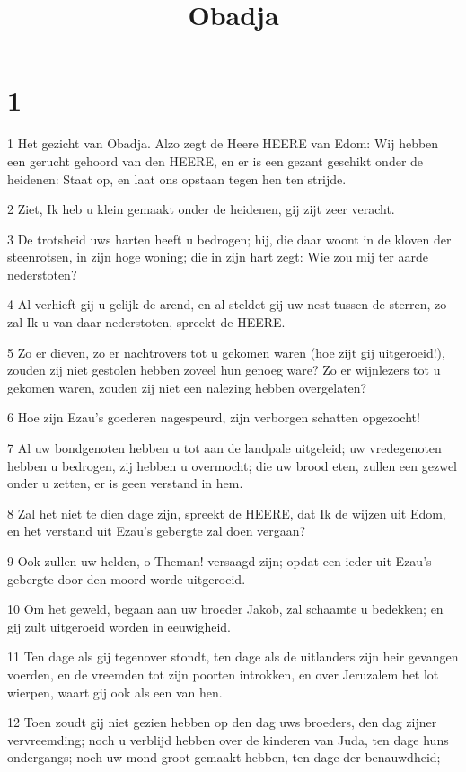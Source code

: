 

\title{Obadja}



\chapter{1}

\par 1 Het gezicht van Obadja. Alzo zegt de Heere HEERE van Edom: Wij hebben een gerucht gehoord van den HEERE, en er is een gezant geschikt onder de heidenen: Staat op, en laat ons opstaan tegen hen ten strijde.
\par 2 Ziet, Ik heb u klein gemaakt onder de heidenen, gij zijt zeer veracht.
\par 3 De trotsheid uws harten heeft u bedrogen; hij, die daar woont in de kloven der steenrotsen, in zijn hoge woning; die in zijn hart zegt: Wie zou mij ter aarde nederstoten?
\par 4 Al verhieft gij u gelijk de arend, en al steldet gij uw nest tussen de sterren, zo zal Ik u van daar nederstoten, spreekt de HEERE.
\par 5 Zo er dieven, zo er nachtrovers tot u gekomen waren (hoe zijt gij uitgeroeid!), zouden zij niet gestolen hebben zoveel hun genoeg ware? Zo er wijnlezers tot u gekomen waren, zouden zij niet een nalezing hebben overgelaten?
\par 6 Hoe zijn Ezau's goederen nagespeurd, zijn verborgen schatten opgezocht!
\par 7 Al uw bondgenoten hebben u tot aan de landpale uitgeleid; uw vredegenoten hebben u bedrogen, zij hebben u overmocht; die uw brood eten, zullen een gezwel onder u zetten, er is geen verstand in hem.
\par 8 Zal het niet te dien dage zijn, spreekt de HEERE, dat Ik de wijzen uit Edom, en het verstand uit Ezau's gebergte zal doen vergaan?
\par 9 Ook zullen uw helden, o Theman! versaagd zijn; opdat een ieder uit Ezau's gebergte door den moord worde uitgeroeid.
\par 10 Om het geweld, begaan aan uw broeder Jakob, zal schaamte u bedekken; en gij zult uitgeroeid worden in eeuwigheid.
\par 11 Ten dage als gij tegenover stondt, ten dage als de uitlanders zijn heir gevangen voerden, en de vreemden tot zijn poorten introkken, en over Jeruzalem het lot wierpen, waart gij ook als een van hen.
\par 12 Toen zoudt gij niet gezien hebben op den dag uws broeders, den dag zijner vervreemding; noch u verblijd hebben over de kinderen van Juda, ten dage huns ondergangs; noch uw mond groot gemaakt hebben, ten dage der benauwdheid;
